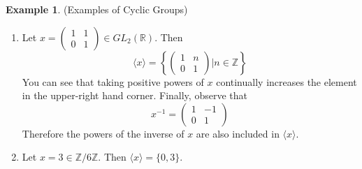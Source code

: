\documentclass[12pt]{article}
\theoremstyle{definition}
\newtheorem{example}{\color{WildStrawberry}Example}
\theoremstyle{definition}
\begin{document}
\begin{example}(Examples of Cyclic Groups)
\begin{enumerate}
	\item Let $x = \begin{pmatrix} 1 & 1 \\ 0 & 1 \end{pmatrix} \in GL_2(\mathbb{R})$. Then
	\begin{equation}
		\langle x \rangle = \left\{ \begin{pmatrix} 1 & n \\ 0 & 1 \end{pmatrix} \Big\vert n \in \mathbb{Z} \right\}
	\end{equation}
	You can see that taking positive powers of $x$ continually increases the element in the upper-right hand corner. Finally, observe that 
	\begin{equation}
		x^{-1} = \begin{pmatrix} 1 & -1 \\ 0 & 1 \end{pmatrix}
	\end{equation}
	Therefore the powers of the inverse of $x$ are also included in $\langle x \rangle$.
	\item Let $x = 3 \in \mathbb{Z} / 6 \mathbb{Z}$. Then $\langle x \rangle = \{ 0, 3 \}$.
\end{enumerate}
\end{example}
\end{document}
